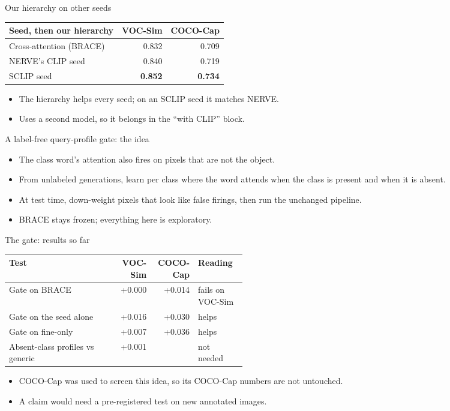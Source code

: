 \documentclass[aspectratio=169,11pt]{beamer}
\begin{document}
\begin{frame}{Our hierarchy on other seeds}
\begin{slidetable}
\begin{tabular}{@{}lrr@{}}
\toprule
Seed, then our hierarchy & VOC-Sim & COCO-Cap \\
\midrule
Cross-attention (BRACE) & 0.832 & 0.709 \\
NERVE's CLIP seed & 0.840 & 0.719 \\
SCLIP seed & \textbf{0.852} & \textbf{0.734} \\
\bottomrule
\end{tabular}
\end{slidetable}
\begin{itemize}
\item The hierarchy helps every seed; on an SCLIP seed it matches NERVE.
\item Uses a second model, so it belongs in the ``with CLIP'' block.
\end{itemize}
\end{frame}

\begin{frame}{A label-free query-profile gate: the idea}
\begin{itemize}
\item The class word's attention also fires on pixels that are not the object.
\item From unlabeled generations, learn per class where the word attends when the class is present and when it is absent.
\item At test time, down-weight pixels that look like false firings, then run the unchanged pipeline.
\item BRACE stays frozen; everything here is exploratory.
\end{itemize}
\end{frame}

\begin{frame}{The gate: results so far}
\begin{slidetable}
\begin{tabular}{@{}L{0.46\linewidth}rrl@{}}
\toprule
Test & VOC-Sim & COCO-Cap & Reading \\
\midrule
Gate on BRACE & +0.000 & +0.014 & fails on VOC-Sim \\
Gate on the seed alone & +0.016 & +0.030 & helps \\
Gate on fine-only & +0.007 & +0.036 & helps \\
Absent-class profiles vs generic & +0.001 & & not needed \\
\bottomrule
\end{tabular}
\end{slidetable}
\begin{itemize}
\item COCO-Cap was used to screen this idea, so its COCO-Cap numbers are not untouched.
\item A claim would need a pre-registered test on new annotated images.
\end{itemize}
\end{frame}
\end{document}
